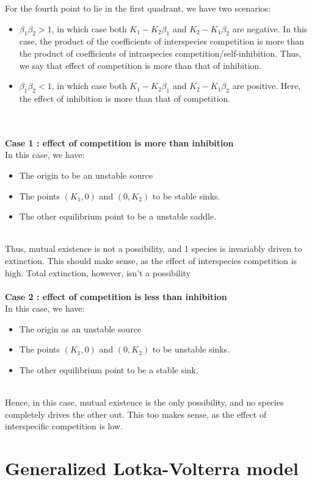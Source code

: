 \documentclass{article}
\begin{document}
For the fourth point to lie in the first quadrant, we have two scenarios:
\begin{itemize}
    \item $\beta_1\beta_2 > 1$, in which case both $K_1 - K_2\beta_1$ and $K_2 - K_1\beta_2$ are negative. In this case, the product of the coefficients of interspecies competition is more than the product of coefficients of intraspecies competition/self-inhibition. Thus, we say that effect of competition is more than that of inhibition.
    \item $\beta_1\beta_2 < 1$, in which case both $K_1 - K_2\beta_1$ and $K_2 - K_1\beta_2$ are positive. Here, the effect of inhibition is more than that of competition.
\end{itemize}
\\
\\
\textbf{Case 1 : effect of competition is more than inhibition}\\
In this case, we have:
\begin{itemize}
    \item The origin to be an unstable source
    \item The points $(K_1, 0)$ and $(0, K_2)$ to be stable sinks.
    \item The other equilibrium point to be a unstable saddle.
\end{itemize}
\\
Thus, mutual existence is not a possibility, and 1 species is invariably driven to extinction. This should make sense, as the effect of interspecies competition is high. Total extinction, however, isn't a possibility
\\
\\
\textbf{Case 2 : effect of competition is less than inhibition}\\
In this case, we have:
\begin{itemize}
    \item The origin as an unstable source
    \item The points $(K_1, 0)$ and $(0, K_2)$ to be unstable sinks.
    \item The other equilibrium point to be a stable sink.
\end{itemize}
\\
Hence, in this case, mutual existence is the only possibility, and no species completely drives the other out. This too makes sense, as the effect of interspecific competition is low.

\section{Generalized Lotka-Volterra model}
\end{document}
